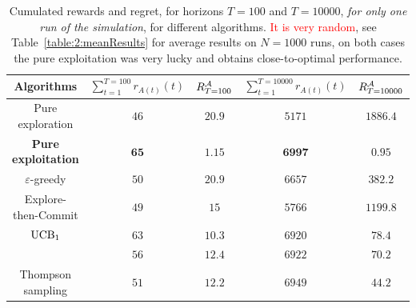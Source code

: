 \begin{table}[ht]
    \begin{small}  %
        \centering
        \begin{tabular}{c|cc|cc}
        \textbf{Algorithms} & $\sum\limits_{t=1}^{T=100} r_{A(t)}(t)$ & $R_{T=100}^{\mathcal{A}}$ & $\sum\limits_{t=1}^{T=10000} r_{A(t)}(t)$ & $R_{T=10000}^{\mathcal{A}}$ \\
            \hline
            Pure exploration
                & $46$ & $20.9$
                & $5171$ & $1886.4$ \\
            \textbf{Pure exploitation}
                & $\mathbf{65}$ & $\mathbf{1.15}$
                & $\mathbf{6997}$ & $\mathbf{0.95}$ \\
            \hline
            $\varepsilon$-greedy
                & $50$ & $20.9$
                & $6657$ & $382.2$ \\
            Explore-then-Commit
                & $49$ & $15$
                & $5766$ & $1199.8$ \\
            \hline
            $\mathrm{UCB}_1$
                & $63$ & $10.3$
                & $6920$ & $78.4$ \\
            \klUCB{}
                & $56$ & $12.4$
                & $6922$ & $70.2$ \\
            \hline
            Thompson sampling
                & $51$ & $12.2$
                & $6949$ & $44.2$ \\
            \hline
        \end{tabular}
        \caption{Cumulated rewards and regret, for horizons $T=100$ and $T=10000$, \emph{for only one run of the simulation}, for different algorithms. \textcolor{red}{It is very random}, see Table~\ref{table:2:meanResults} for average results on $N=1000$ runs, on both cases the pure exploitation was very lucky and obtains close-to-optimal performance.}
        \label{table:2:oneShotResult}
    \end{small}  %
\end{table}

